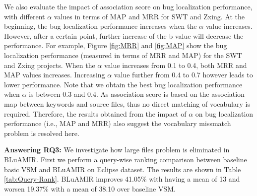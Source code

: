 \documentclass[conference]{IEEEtran}
\begin{document}
We also evaluate the impact of association score
on bug localization performance, with different $\alpha$ values in terms of MAP and MRR for SWT and Zxing. At the beginning, the bug localization performance increases when the $\alpha$ value increases. However, after a certain point, further increase of the b value will decrease the performance. For example, Figure \ref{fig:MRR} and \ref{fig:MAP} show the bug localization performance (measured in terms of MRR and MAP) for the SWT and Zxing projects. When the $\alpha$ value increases from 0.1 to 0.4, both MRR and MAP values increases. Increasing $\alpha$ value further from 0.4 to 0.7 however leads to lower performance. Note that we obtain the best bug localization performance when $\alpha$ is between 0.3 and 0.4. As association score is based on the association map between keywords and source files, thus no direct matching of vocabulary is required. Therefore, the results obtained from the impact of $\alpha$ on bug localization performance (i.e., MAP and MRR) also suggest the vocabulary missmatch problem is resolved here.









\textbf{Answering RQ3:} \label{answerRQ3}
We investigate how large files problem is eliminated in BLuAMIR. First we perform a query-wise ranking comparison between baseline basic VSM and BLuAMIR on Eclipse dataset. The results are shown in Table \ref{tab:Query-Rank}.
BLuAMIR improves 41.05\% with having a mean of 13 and worsen 19.37\% with a mean of 38.10 over baseline VSM. 
\end{document}
